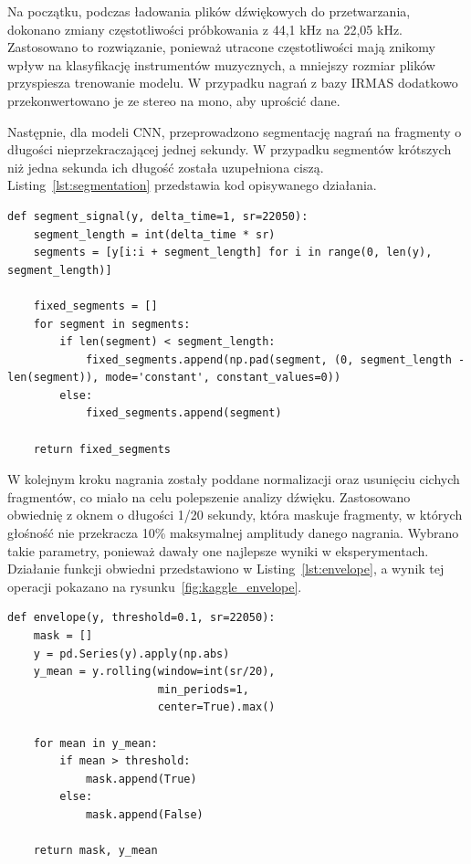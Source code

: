 \documentclass{SGGW-thesis}
\begin{document}
Na początku, podczas ładowania plików dźwiękowych do przetwarzania, dokonano zmiany częstotliwości próbkowania z 44,1 kHz na 22,05 kHz. Zastosowano to rozwiązanie, ponieważ utracone częstotliwości mają znikomy wpływ na klasyfikację instrumentów muzycznych, a mniejszy rozmiar plików przyspiesza trenowanie modelu. W przypadku nagrań z bazy IRMAS dodatkowo przekonwertowano je ze stereo na mono, aby uprościć dane.

Następnie, dla modeli CNN, przeprowadzono segmentację nagrań na fragmenty o długości nieprzekraczającej jednej sekundy. W przypadku segmentów krótszych niż jedna sekunda ich długość została uzupełniona ciszą. Listing~\ref{lst:segmentation} przedstawia kod opisywanego działania.
\begin{lstlisting}[caption=Funkcja segmentująca nagranie na jednosekundowe fragmenty, label={lst:segmentation}, captionpos=b]
def segment_signal(y, delta_time=1, sr=22050):
    segment_length = int(delta_time * sr)
    segments = [y[i:i + segment_length] for i in range(0, len(y), segment_length)]
    
    fixed_segments = []
    for segment in segments:
        if len(segment) < segment_length:
            fixed_segments.append(np.pad(segment, (0, segment_length - len(segment)), mode='constant', constant_values=0))
        else:
            fixed_segments.append(segment)

    return fixed_segments
\end{lstlisting}

W kolejnym kroku nagrania zostały poddane normalizacji oraz usunięciu cichych fragmentów, co miało na celu polepszenie analizy dźwięku. Zastosowano obwiednię z oknem o długości 1/20 sekundy, która maskuje fragmenty, w których głośność nie przekracza 10\% maksymalnej amplitudy danego nagrania. Wybrano takie parametry, ponieważ dawały one najlepsze wyniki w eksperymentach. Działanie funkcji obwiedni przedstawiono w Listing~\ref{lst:envelope}, a wynik tej operacji pokazano na rysunku~\ref{fig:kaggle_envelope}.

\begin{lstlisting}[caption=Funkcja obwiedni do maskowania cichych fragmentów nagrań audio, label={lst:envelope}, captionpos=b]
def envelope(y, threshold=0.1, sr=22050):
    mask = []
    y = pd.Series(y).apply(np.abs)
    y_mean = y.rolling(window=int(sr/20),
                       min_periods=1,
                       center=True).max()
    
    for mean in y_mean:
        if mean > threshold:
            mask.append(True)
        else:
            mask.append(False)

    return mask, y_mean
\end{lstlisting}
\end{document}
